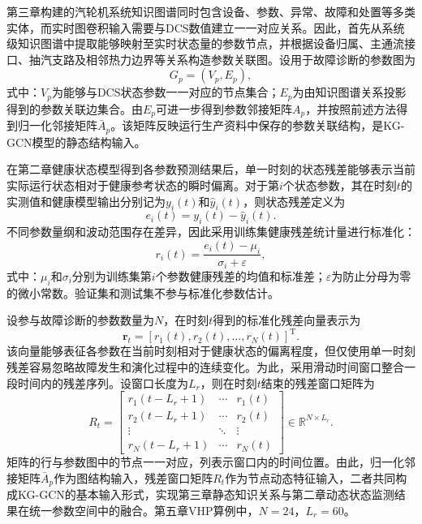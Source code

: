第三章构建的汽轮机系统知识图谱同时包含设备、参数、异常、故障和处置等多类实体，而实时图卷积输入需要与DCS数值建立一一对应关系。因此，首先从系统级知识图谱中提取能够映射至实时状态量的参数节点，并根据设备归属、主通流接口、抽汽支路及相邻热力边界等关系构造参数关联图。设用于故障诊断的参数图为
\begin{equation}
G_p=(V_p,E_p),
\end{equation}
式中：$V_p$为能够与DCS状态参数一一对应的节点集合；$E_p$为由知识图谱关系投影得到的参数关联边集合。由$E_p$可进一步得到参数邻接矩阵$A_p$，并按照前述方法得到归一化邻接矩阵$\bar A_p$。该矩阵反映运行生产资料中保存的参数关联结构，是KG-GCN模型的静态结构输入。

在第二章健康状态模型得到各参数预测结果后，单一时刻的状态残差能够表示当前实际运行状态相对于健康参考状态的瞬时偏离。对于第$i$个状态参数，其在时刻$t$的实测值和健康模型输出分别记为$y_i(t)$和$\hat y_i(t)$，则状态残差定义为
\begin{equation}
e_i(t)=y_i(t)-\hat y_i(t) .
\end{equation}
不同参数量纲和波动范围存在差异，因此采用训练集健康残差统计量进行标准化：
\begin{equation}
r_i(t)=\frac{e_i(t)-\mu_i}{\sigma_i+\varepsilon},
\end{equation}
式中：$\mu_i$和$\sigma_i$分别为训练集第$i$个参数健康残差的均值和标准差；$\varepsilon$为防止分母为零的微小常数。验证集和测试集不参与标准化参数估计。

设参与故障诊断的参数数量为$N$，在时刻$t$得到的标准化残差向量表示为
\begin{equation}
\mathbf r_t=[r_1(t),r_2(t),\ldots,r_N(t)]^{\mathrm T} .
\end{equation}
该向量能够表征各参数在当前时刻相对于健康状态的偏离程度，但仅使用单一时刻残差容易忽略故障发生和演化过程中的连续变化。为此，采用滑动时间窗口整合一段时间内的残差序列。设窗口长度为$L_r$，则在时刻$t$结束的残差窗口矩阵为
\begin{equation}
R_t=
\begin{bmatrix}
r_1(t-L_r+1)&\cdots&r_1(t)\\
r_2(t-L_r+1)&\cdots&r_2(t)\\
\vdots&\ddots&\vdots\\
r_N(t-L_r+1)&\cdots&r_N(t)
\end{bmatrix}
\in\mathbb{R}^{N\times L_r} .
\end{equation}
矩阵的行与参数图中的节点一一对应，列表示窗口内的时间位置。由此，归一化邻接矩阵$\bar A_p$作为图结构输入，残差窗口矩阵$R_t$作为节点动态特征输入，二者共同构成KG-GCN的基本输入形式，实现第三章静态知识关系与第二章动态状态监测结果在统一参数空间中的融合。第五章VHP算例中，$N=24$，$L_r=60$。

